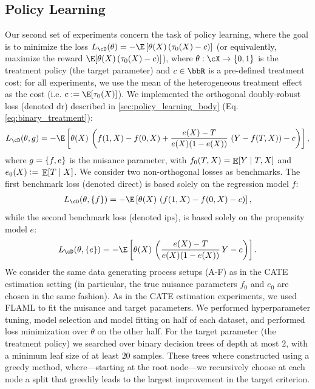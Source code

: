 \documentclass[11pt]{article} %
\newcommand{\pref}[1]{\cref{#1}}
\theoremstyle{theorem}  %
\theoremstyle{plain}
\DeclarePairedDelimiter{\brk}{[}{]}
\DeclarePairedDelimiter{\crl}{\{}{\}}
\DeclareMathOperator{\En}{\mathbb{E}}
\newcommand{\ldef}{\vcentcolon=}
\newcommand{\poprisk}{L_{\cD}}
\begin{document}
\subsection{Policy Learning} Our second set of experiments concern the task of policy learning, where the goal is to minimize the loss $\poprisk(\theta) = -\E\left[\theta(X)\, (\tau_0(X) - c)\right]$ (or equivalently, maximize the reward $\E[\theta(X)\, (\tau_0(X) - c)]$), where $\theta: \cX\to \{0, 1\}$ is the treatment policy (the target parameter) and $c\in\bbR$ is a pre-defined treatment cost; for all experiments, we use the mean of the heterogeneous treatment effect as the cost (i.e. $c:=\E[\tau_0(X)]$). We implemented the orthogonal doubly-robust loss (denoted $\text{dr}$) described in \pref{sec:policy_learning_body} (Eq. \pref{eq:binary_treatment}):
\begin{align}
  \poprisk(\theta,g) = -\E\left[\theta(X)\, \left(f(1, X) - f(0, X) + \frac{e(X)-T}{e(X) (1 - e(X))}\, \left(Y - f(T, X)\right) - c\right)\right],
\end{align}
where $g=\crl{f,e}$ is the nuisance parameter, with $f_0(T,X)=\En\brk*{Y\mid{}T,X}$ and $e_0(X)\ldef{}\En\brk*{T\mid{}X}$. We consider two non-orthogonal losses as benchmarks. The first benchmark loss (denoted $\text{direct}$) is based solely on the regression model $f$:
\begin{align}
    \poprisk(\theta,\crl{f}) = -\E\left[\theta(X)\, \left(f(1, X) - f(0, X) - c\right)\right],
\end{align}
while the second benchmark loss (denoted $\text{ips}$), is based solely on the propensity model $e$:
\begin{align}
  \poprisk(\theta,\crl{e}) = -\E\left[\theta(X)\, \left(\frac{e(X) - T}{e(X) (1 - e(X))}\, Y - c\right)\right].
\end{align}
We consider the same data generating process setups (A-F) as in the CATE estimation setting (in particular, the true nuisance parameters $f_0$ and $e_0$ are chosen in the same fashion). As in the CATE estimation experiments, we used FLAML to fit the nuisance and target parameters. We performed hyperparameter tuning, model selection and model fitting on half of each dataset, and performed loss minimization over $\theta$ on the other half. For the target parameter (the treatment policy) we searched over binary decision trees of depth at most $2$, with a minimum leaf size of at least $20$ samples. These trees where constructed using a greedy method, where---starting at the root node---we recursively choose at each node a split that greedily leads to the largest improvement in the target criterion.
%
\end{document}
